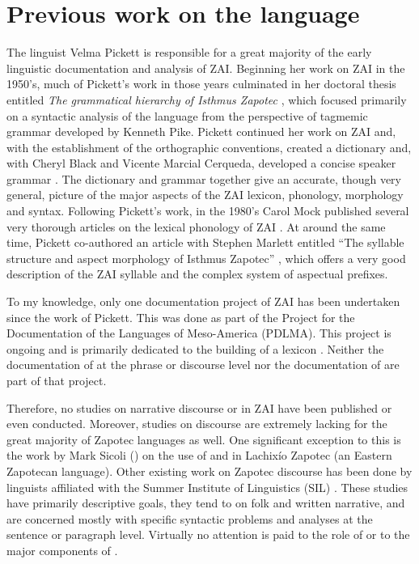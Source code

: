 \section{Previous work on the language}
\largerpage
The linguist Velma Pickett is responsible for a great majority of the early linguistic documentation and analysis of ZAI.  Beginning her work on ZAI in the 1950's, much of Pickett's work in those years culminated in her doctoral thesis entitled \textit{The grammatical hierarchy of Isthmus Zapotec} \citep{pickett1960}, which focused primarily on a syntactic analysis of the language from the perspective of tagmemic grammar developed by Kenneth Pike. Pickett continued her work on ZAI and, with the establishment of the orthographic conventions, created a dictionary \citep{pickett1979} and, with Cheryl Black and Vicente Marcial Cerqueda, developed a concise speaker grammar \citep{pickett1998}. The dictionary and grammar together give an accurate, though very general, picture of the major aspects of the ZAI lexicon, phonology, morphology and syntax. Following Pickett's work, in the 1980's Carol Mock published several very thorough articles on the lexical phonology of ZAI \citep{mock1983,mock1985a,mock1985b,mock1988}. At around the same time, Pickett co-authored an article with Stephen Marlett entitled ``The syllable structure and aspect morphology of Isthmus Zapotec'' \citep{marlett1987}, which offers a very good description of the ZAI syllable and the complex system of aspectual prefixes. 

To my knowledge, only one documentation project of ZAI has been undertaken since the work of Pickett. This was done as part of the Project for the Documentation of the Languages of Meso-America (PDLMA). This project is ongoing and is primarily dedicated to the building of a lexicon \citep{perezms}. Neither the documentation of  at the phrase or discourse level nor the documentation of  are part of that project. 

Therefore, no studies on narrative discourse or  in ZAI have been published or even conducted. Moreover, studies on discourse are extremely lacking for the great majority of Zapotec languages as well. One significant exception to this is the work by Mark Sicoli (\citealt{sicoli2007,sicoli2010}) on the use of  and  in Lachix\'{i}o Zapotec (an Eastern Zapotecan language). Other existing work on Zapotec discourse has been done by linguists affiliated with the Summer Institute of Linguistics (SIL)  \citep{persons1979,long1985,benton1987,benton1997,kreikebaum1987,riggs1987,ward1987,piper1995,heise2003,riggs2010}. These studies have primarily descriptive goals, they tend to  on folk and written narrative, and are concerned mostly with specific syntactic problems and analyses at the sentence or paragraph level. Virtually no attention is paid to the role of  or to the major components of .

